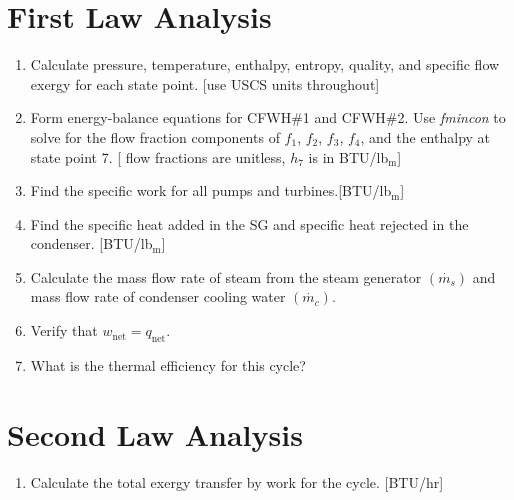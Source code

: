 \begin{fullwidth}
\section{First Law Analysis}
\begin{enumerate}
\item Calculate pressure, temperature, enthalpy, entropy, quality, and specific flow exergy for each state point. [use USCS units throughout]

\vspace{1.0 cm}

\item Form energy-balance equations for CFWH\#1 and CFWH\#2.  Use \emph{fmincon} to solve for the flow fraction components of $f_1$, $f_2$, $f_3$, $f_4$, and the enthalpy at state point 7. [ flow fractions are unitless, $h_7$ is in BTU/lb$_\text{m}$]

\vspace{1.0cm}

\item Find the specific work for all pumps and turbines.[BTU/lb$_\text{m}$]

\vspace{1.0 cm}
\item Find the specific heat added in the SG and specific heat rejected in the condenser. [BTU/lb$_\text{m}$]

\vspace{1.0 cm}

\item Calculate the mass flow rate of steam from the steam generator $(\dot{m_{s}})$ and mass flow rate of condenser cooling water $(\dot{m_{c}})$.
\vspace{1.0cm}

\item Verify that $w_{\text{net}} = q_{\text{net}}$.

\vspace{1.0 cm}

\item What is the thermal efficiency for this cycle?

\end{enumerate}

\section{Second Law Analysis}

\begin{enumerate}[resume]
\item Calculate the total exergy transfer by work for the cycle. [BTU/hr]


\end{enumerate}
\end{fullwidth}
